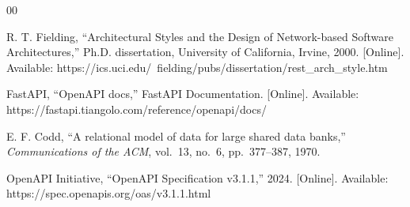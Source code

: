 ﻿\documentclass[conference,a4paper]{IEEEtran}
\begin{document}
\balance
\begin{thebibliography}{00}

R. T. Fielding, ``Architectural Styles and the Design of Network-based Software Architectures,'' Ph.D. dissertation, University of California, Irvine, 2000. [Online]. Available: https://ics.uci.edu/~fielding/pubs/dissertation/rest\_arch\_style.htm

FastAPI, ``OpenAPI docs,'' FastAPI Documentation. [Online]. Available: https://fastapi.tiangolo.com/reference/openapi/docs/

E. F. Codd, ``A relational model of data for large shared data banks,'' \textit{Communications of the ACM}, vol.~13, no.~6, pp.~377--387, 1970.

OpenAPI Initiative, ``OpenAPI Specification v3.1.1,'' 2024. [Online]. Available: https://spec.openapis.org/oas/v3.1.1.html

\end{thebibliography}
\end{document}

